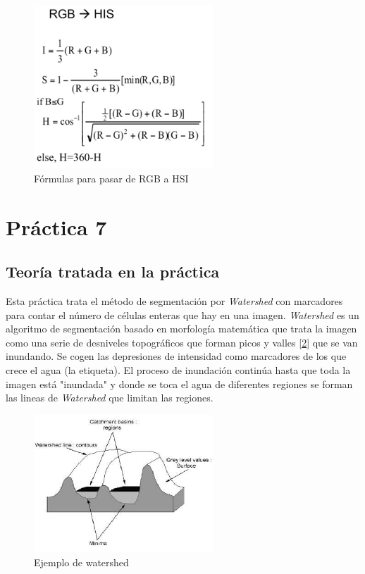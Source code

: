 \documentclass[a4paper,12pt]{report}
\begin{document}
\begin{figure}[h]
\centering
\includegraphics[width=0.6\textwidth]{imagenes/rgb2hsi}
\caption{Fórmulas para pasar de RGB a HSI}
\label{rgb2hsi} 
\end{figure}

\section{ Práctica 7}
\subsection{Teoría tratada en la práctica}

Esta práctica trata el método de segmentación por \emph{Watershed} con marcadores para contar el número de células enteras que hay en una imagen.\emph{ Watershed} es un algoritmo de segmentación basado en morfología matemática que trata la imagen como una serie de desniveles topográficos que forman picos y valles [\ref{watershed}] que se van inundando. Se cogen las depresiones de intensidad como marcadores de los que crece el agua (la etiqueta). El proceso de inundación continúa hasta que toda la imagen está "inundada" y donde se toca el agua de diferentes regiones se forman las lineas de  \emph{Watershed} que limitan las regiones.\\

\begin{figure}[h]
\centering
\includegraphics[width=0.6\textwidth]{imagenes/valles}
\caption{Ejemplo de watershed}
\label{watershed} 
\end{figure}
\end{document}
